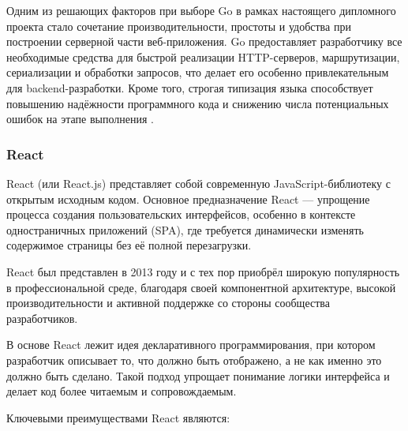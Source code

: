 \documentclass[diploma]{SCWorks}
\begin{document}
Одним из решающих факторов при выборе Go в рамках настоящего дипломного 
проекта стало сочетание производительности, простоты и удобства при 
построении серверной части веб-приложения. Go предоставляет разработчику все 
необходимые средства для быстрой реализации HTTP-серверов, маршрутизации, 
сериализации и обработки запросов, что делает его особенно привлекательным 
для backend-разработки. Кроме того, строгая типизация языка способствует 
повышению надёжности программного кода и снижению числа потенциальных ошибок 
на этапе выполнения \cite{go-docs,go-by-example}.

\subsubsection{React}

React (или React.js) представляет собой современную JavaScript-библиотеку с 
открытым исходным кодом. Основное предназначение React — упрощение процесса 
создания пользовательских интерфейсов, особенно в контексте одностраничных 
приложений (SPA), где требуется динамически изменять содержимое страницы без 
её полной перезагрузки.

React был представлен в 2013 году и с тех пор приобрёл широкую популярность 
в профессиональной среде, благодаря своей компонентной архитектуре, высокой 
производительности и активной поддержке со стороны сообщества разработчиков.

В основе React лежит идея декларативного программирования, при котором 
разработчик описывает то, что должно быть отображено, а не как именно это 
должно быть сделано. Такой подход упрощает понимание логики интерфейса и 
делает код более читаемым и сопровождаемым.

Ключевыми преимуществами React являются:
\end{document}
